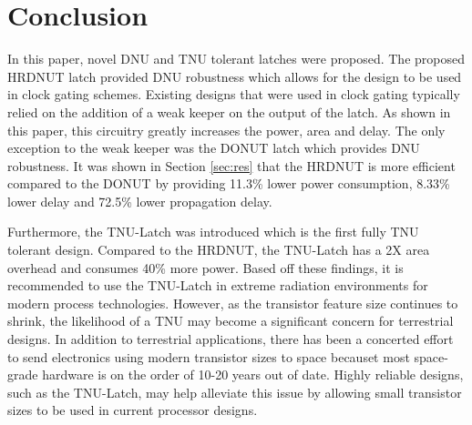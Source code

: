 \section{Conclusion} \label{sec:conc}
In this paper, novel DNU and TNU tolerant latches were proposed. The proposed HRDNUT latch provided DNU robustness which allows for the design to be used in clock gating schemes. Existing designs that were used in clock gating typically relied on the addition of a weak keeper on the output of the latch. As shown in this paper, this circuitry greatly increases the power, area and delay. The only exception to the weak keeper was the DONUT latch which provides DNU robustness. It was shown in Section \ref{sec:res} that the HRDNUT is more efficient compared to the DONUT by providing 11.3\% lower power consumption, 8.33\% lower delay and 72.5\% lower propagation delay. 

Furthermore, the TNU-Latch was introduced which is the first fully TNU tolerant design. Compared to the HRDNUT, the TNU-Latch has a 2X area overhead and consumes 40\% more power. Based off these findings, it is recommended to use the TNU-Latch in extreme radiation environments for modern process technologies. However, as the transistor feature size continues to shrink, the likelihood of a TNU may become a significant concern for terrestrial designs. In addition to terrestrial applications, there has been a concerted effort to send electronics using modern transistor sizes to space becauset most space-grade hardware is on the order of 10-20 years out of date. Highly reliable designs, such as the TNU-Latch, may help alleviate this issue by allowing small transistor sizes to be used in current processor designs.